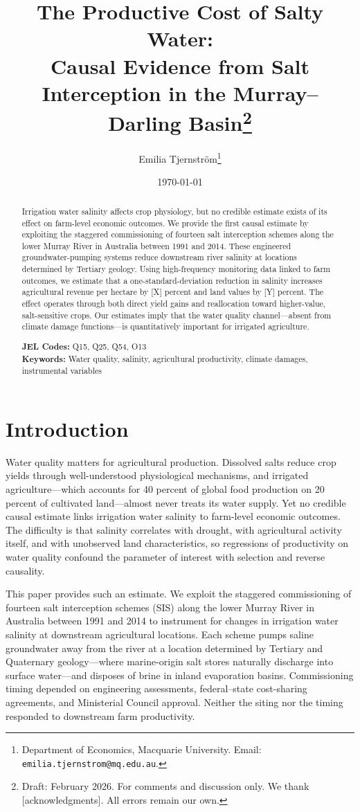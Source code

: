 \documentclass[12pt]{article}
\title{\textbf{The Productive Cost of Salty Water:\\ Causal Evidence from Salt Interception in the Murray--Darling Basin}\thanks{Draft: February 2026. For comments and discussion only. We thank [acknowledgments]. All errors remain our own.}}
\author{Emilia Tjernstr{\"o}m\thanks{Department of Economics, Macquarie University. Email: \texttt{emilia.tjernstrom@mq.edu.au}.}}
\date{\today}
\begin{document}
\maketitle
\singlespacing
\begin{abstract}
\noindent Irrigation water salinity affects crop physiology, but no credible estimate exists of its effect on farm-level economic outcomes. We provide the first causal estimate by exploiting the staggered commissioning of fourteen salt interception schemes along the lower Murray River in Australia between 1991 and 2014. These engineered groundwater-pumping systems reduce downstream river salinity at locations determined by Tertiary geology. Using high-frequency monitoring data linked to farm outcomes, we estimate that a one-standard-deviation reduction in salinity increases agricultural revenue per hectare by [X] percent and land values by [Y] percent. The effect operates through both direct yield gains and reallocation toward higher-value, salt-sensitive crops. Our estimates imply that the water quality channel---absent from climate damage functions---is quantitatively important for irrigated agriculture.

\medskip
\noindent \textbf{JEL Codes:} Q15, Q25, Q54, O13 \\
\textbf{Keywords:} Water quality, salinity, agricultural productivity, climate damages, instrumental variables
\end{abstract}

\newpage
\onehalfspacing
\section{Introduction}

Water quality matters for agricultural production. Dissolved salts reduce crop yields through well-understood physiological mechanisms, and irrigated agriculture---which accounts for 40 percent of global food production on 20 percent of cultivated land---almost never treats its water supply. Yet no credible causal estimate links irrigation water salinity to farm-level economic outcomes. The difficulty is that salinity correlates with drought, with agricultural activity itself, and with unobserved land characteristics, so regressions of productivity on water quality confound the parameter of interest with selection and reverse causality.

This paper provides such an estimate. We exploit the staggered commissioning of fourteen salt interception schemes (SIS) along the lower Murray River in Australia between 1991 and 2014 to instrument for changes in irrigation water salinity at downstream agricultural locations. Each scheme pumps saline groundwater away from the river at a location determined by Tertiary and Quaternary geology---where marine-origin salt stores naturally discharge into surface water---and disposes of brine in inland evaporation basins. Commissioning timing depended on engineering assessments, federal--state cost-sharing agreements, and Ministerial Council approval. Neither the siting nor the timing responded to downstream farm productivity.
\end{document}
